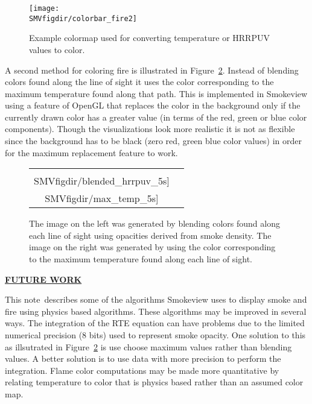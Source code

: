 \documentclass[11pt]{article}
\newcommand{\paper}{note}
\newcommand{\SMVfigdir}{../../../fig/smv/figures}
\newcommand{\ssection}[1]{\underline{\bf #1}}
\begin{document}
\begin{figure}[bph]
\begin{center}
\texttt{[image: \\SMVfigdir/colorbar\_fire2]}
\end{center}
\caption{Example colormap used for converting temperature or HRRPUV values to color.}
\label{fig:colormaps}
\end{figure}

A second method for coloring fire is illustrated in Figure~\ref{fig:blendedmaximages}.  
Instead of blending colors found along the line of sight it uses the color corresponding to the maximum temperature found along that path. This is implemented in Smokeview using a feature of OpenGL that replaces the color in the background only if the currently drawn color has a greater value (in terms of the red, green or blue color components).  Though the visualizations look more realistic it is not as flexible since the background has to be black (zero red, green blue color values) in order for the maximum replacement feature to work.

\begin{figure}[bph]
\begin{center}
\begin{tabular}{cc}
\texttt{[image: \\SMVfigdir/blended\_hrrpuv\_5s]}&
\texttt{[image: \\SMVfigdir/max\_temp\_5s]}
\end{tabular}
\end{center}
\caption{The image on the left was generated by blending colors found along each line of sight using opacities derived from smoke density.  The image on the right was generated by using the color corresponding
to the maximum temperature found along each line of sight.}
\label{fig:blendedmaximages}
\end{figure}



\ssection{FUTURE WORK}

This \paper\ describes some of the algorithms Smokeview uses to display
smoke and fire using physics based algorithms. These algorithms
may be improved in several ways. The integration of the RTE equation can have problems
due to the limited numerical precision (8 bits) used to represent smoke opacity.
One solution to this as illsutrated in Figure~\ref{fig:blendedmaximages} is use choose maximum values rather than blending values.  A better solution is to use data with
more precision to perform the integration. Flame color computations may be made more quantitative by
relating temperature to color that is physics based rather than an assumed
color map.



\end{document}
